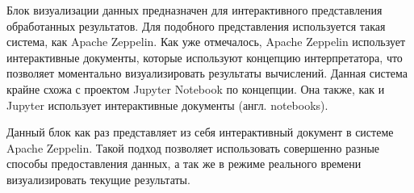 Блок визуализации данных предназначен для интерактивного представления обработанных результатов.
Для подобного представления используется такая система, как Apache Zeppelin.
Как уже отмечалось, Apache Zeppelin использует интерактивные документы, которые используют концепцию интерпретатора, что позволяет моментально визуализировать результаты вычислений.
Данная система крайне схожа с проектом Jupyter Notebook по концепции.
Она также, как и Jupyter использует интерактивные документы (англ. notebooks).

Данный блок как раз представляет из себя интерактивный документ в системе Apache Zeppelin.
Такой подход позволяет использовать совершенно разные способы предоставления данных, а так же в режиме реального времени визуализировать текущие результаты.
